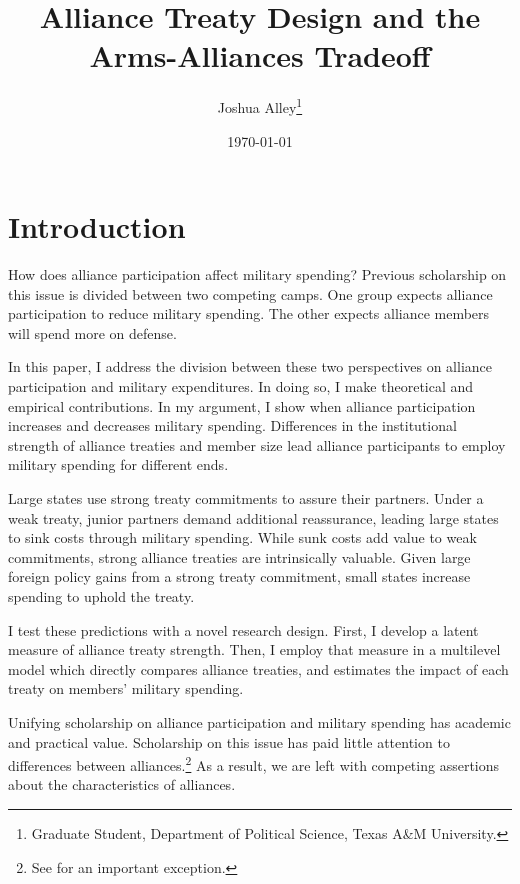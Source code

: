 \documentclass[12pt]{article}
\title{\textbf{Alliance Treaty Design and the Arms-Alliances Tradeoff}}
\author{Joshua Alley\footnote{Graduate Student,
Department of Political Science, Texas A\&M University.}}
\date{{\normalsize \today}}
\begin{document}
\maketitle 

\newpage 

\doublespace 

\begin{abstract}



\end{abstract}



\section{Introduction}


How does alliance participation affect military spending? 
Previous scholarship on this issue is divided between two competing camps. 
One group expects alliance participation to reduce military spending. 
The other expects alliance members will spend more on defense. 


In this paper, I address the division between these two perspectives on alliance participation and military expenditures. 
In doing so, I make theoretical and empirical contributions. 
In my argument, I show when alliance participation increases and decreases military spending. 
Differences in the institutional strength of alliance treaties and member size lead alliance participants to employ military spending for different ends. 


Large states use strong treaty commitments to assure their partners. 
Under a weak treaty, junior partners demand additional reassurance, leading large states to sink costs through military spending.
While sunk costs add value to weak commitments, strong alliance treaties are intrinsically valuable. 
Given large foreign policy gains from a strong treaty commitment, small states increase spending to uphold the treaty. 


I test these predictions with a novel research design.
First, I develop a latent measure of alliance treaty strength. 
Then, I employ that measure in a multilevel model which directly compares alliance treaties, and estimates the impact of each treaty on members' military spending.  


Unifying scholarship on alliance participation and military spending has academic and practical value.
Scholarship on this issue has paid little attention to differences between alliances.\footnote{See \citet{DigiuseppePoast2016} for an important exception.} 
As a result, we are left with competing assertions about the characteristics of alliances. 
\end{document}
